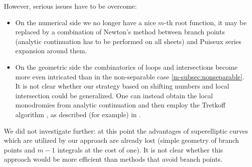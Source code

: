 \documentclass[main.tex]{subfiles}
\begin{document}
  However, serious issues have to be overcome:
  \begin{itemize}
      \item On the numerical side we no longer have a nice $m$-th root function,
          it may be replaced by a combination of Newton's method between branch
          points (analytic continuation has to
          be performed on all sheets) and
          Puiseux series expansion around them.
      \item On the geometric side the combinatorics of loops and intersections
          become more even intricated than in the non-separable case \ref{m-subsec:nonseparable}.
          It is not clear whether our strategy
          based on shifting numbers and local intersection could be generalized.
          One can instead obtain the local monodromies from analytic continuation  
          and then employ the Tretkoff algorithm \cite{TT1984}, as described (for example) in \cite{Frauendiener2016}.
  \end{itemize}
  We did not investigate further: at this point the advantages
  of superelliptic curves which are utilized by our approach are already lost
  (simple geometry of branch points and $m-1$ integrals at the cost of one).
  It is not clear whether this approach would
  be more efficient than methods that avoid branch points.

  \biblio
  
\end{document}

